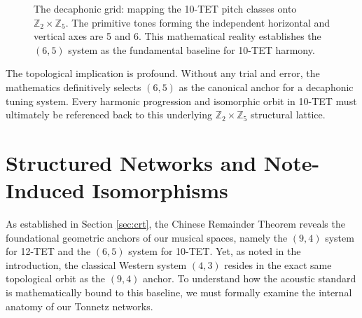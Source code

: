\documentclass[11pt,letterpaper]{amsart}
\newcommand{\Z}{\mathbb{Z}}
\begin{document}
\begin{figure}[H]
    \centering
    \caption{The decaphonic grid: mapping the 10-TET pitch classes onto $\Z_2 \times \Z_5$. The primitive tones forming the independent horizontal and vertical axes are {\color{blue}5} and {\color{red}6}. This mathematical reality establishes the $(6,5)$ system as the fundamental baseline for 10-TET harmony.}
    \label{fig:crt_grid_10tet}
\end{figure}

The topological implication is profound. Without any trial and error, the mathematics definitively selects $(6,5)$ as the canonical anchor for a decaphonic tuning system. Every harmonic progression and isomorphic orbit in 10-TET must ultimately be referenced back to this underlying $\Z_2 \times \Z_5$ structural lattice.


\section{Structured Networks and Note-Induced Isomorphisms}
\label{sec:isomorphisms}

As established in Section \ref{sec:crt}, the Chinese Remainder Theorem reveals the foundational geometric anchors of our musical spaces, namely the $(9,4)$ system for 12-TET and the $(6,5)$ system for 10-TET. Yet, as noted in the introduction, the classical Western system $(4,3)$ resides in the exact same topological orbit as the $(9,4)$ anchor. To understand how the acoustic standard is mathematically bound to this baseline, we must formally examine the internal anatomy of our Tonnetz networks.
\end{document}
